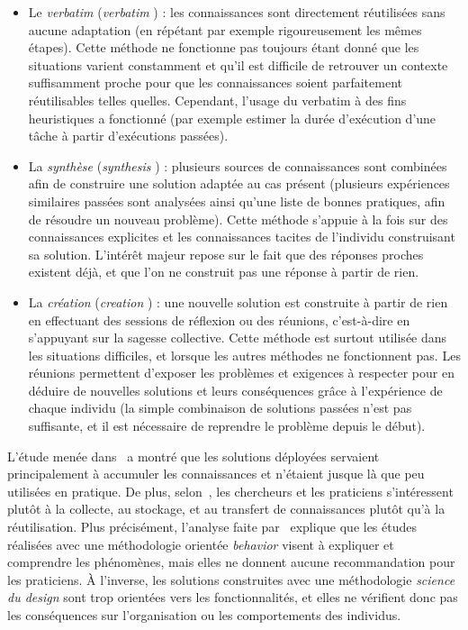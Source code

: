 \begin{itemize}
\item Le \textit{verbatim} (\og \textit{verbatim} \fg) : les connaissances sont directement réutilisées sans aucune adaptation (en répétant par exemple rigoureusement les mêmes étapes).
Cette méthode ne fonctionne pas toujours étant donné que les situations varient constamment et qu'il est difficile de retrouver un contexte suffisamment proche pour que les connaissances soient parfaitement réutilisables telles quelles.
Cependant, l'usage du verbatim à des fins heuristiques a fonctionné (par exemple estimer la durée d'exécution d'une tâche à partir d'exécutions passées).\\

\item La \textit{synthèse} (\og \textit{synthesis} \fg) : plusieurs sources de connaissances sont combinées afin de construire une solution adaptée au cas présent (plusieurs expériences similaires passées sont analysées ainsi qu'une liste de bonnes pratiques, afin de résoudre un nouveau problème).
Cette méthode s'appuie à la fois sur des connaissances explicites et les connaissances tacites de l'individu construisant sa solution.
L'intérêt majeur repose sur le fait que des réponses proches existent déjà, et que l'on ne construit pas une réponse à partir de rien.\\

\item La \textit{création} (\og \textit{creation} \fg) : une nouvelle solution est construite à partir de rien en effectuant des sessions de réflexion ou des réunions, c'est-à-dire en s'appuyant sur la sagesse collective.
Cette méthode est surtout utilisée dans les situations difficiles, et lorsque les autres méthodes ne fonctionnent pas.
Les réunions permettent d'exposer les problèmes et exigences à respecter pour en déduire de nouvelles solutions et leurs conséquences grâce à l'expérience de chaque individu (la simple combinaison de solutions passées n'est pas suffisante, et il est nécessaire de reprendre le problème depuis le début).
\end{itemize}

\bigskip

L'étude menée dans~\cite{ajmal2008knowledge} a montré que les solutions déployées servaient principalement à accumuler les connaissances et n'étaient jusque là que peu utilisées en pratique.
De plus, selon~\cite{schacht2016methodology}, les chercheurs et les praticiens s'intéressent plutôt à la collecte, au stockage, et au transfert de connaissances plutôt qu'à la réutilisation.
Plus précisément, l'analyse faite par~\cite{schacht2016methodology} explique que les études réalisées avec une méthodologie orientée \textit{behavior} visent à expliquer et comprendre les phénomènes, mais elles ne donnent aucune recommandation pour les praticiens.
À l'inverse, les solutions construites avec une méthodologie \textit{science du design} sont trop orientées vers les fonctionnalités, et elles ne vérifient donc pas les conséquences sur l'organisation ou les comportements des individus.

